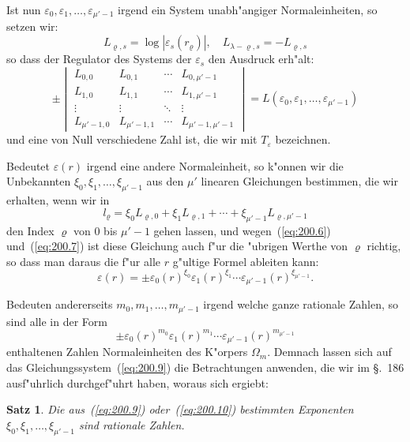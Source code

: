\documentclass[10pt,a4paper]{article}
\theoremstyle{weberstyle}
\newtheorem{satz}{Satz}[section]
\begin{document}
Ist nun $\varepsilon_0,\varepsilon_1,\dots,\varepsilon_{\mu'-1}$ irgend ein System
unabh"angiger Normaleinheiten, so setzen wir:
\begin{equation}\label{eq:200.7}
L_{\varrho,s}=\log|\varepsilon_s(r_\varrho)|,\quad L_{\lambda-\varrho,s}=-L_{\varrho,s}
\end{equation}
so dass der Regulator des Systems der $\varepsilon_s$ den Ausdruck erh"alt:
\begin{equation}\label{eq:200.8}
\pm\begin{vmatrix}
L_{0,0} & L_{0,1} & \cdots & L_{0,\mu'-1} \\
L_{1,0} & L_{1,1} & \cdots & L_{1,\mu'-1} \\
\vdots & \vdots & \ddots & \vdots \\
L_{\mu'-1,0} & L_{\mu'-1,1} & \cdots & L_{\mu'-1,\mu'-1}
\end{vmatrix}
= L(\varepsilon_0,\varepsilon_1,\dots,\varepsilon_{\mu'-1})
\end{equation}
und eine von Null verschiedene Zahl ist, die wir mit $T_\varepsilon$ bezeichnen.

Bedeutet $\varepsilon(r)$ irgend eine andere Normaleinheit, so k"onnen wir die
Unbekannten $\xi_0,\xi_1,\dots,\xi_{\mu'-1}$ aus den $\mu'$ linearen Gleichungen
bestimmen, die wir erhalten, wenn wir in
\begin{equation}\label{eq:200.9}
l_\varrho = \xi_0 L_{\varrho,0} + \xi_1 L_{\varrho,1} + \cdots +
\xi_{\mu'-1} L_{\varrho,\mu'-1}
\end{equation}
den Index $\varrho$ von $0$ bis $\mu'-1$ gehen lassen, und wegen~(\ref{eq:200.6})
und~(\ref{eq:200.7}) ist diese Gleichung auch f"ur die "ubrigen Werthe von
$\varrho$ richtig, so dass man daraus die f"ur alle $r$ g"ultige Formel
ableiten kann:
\begin{equation}\label{eq:200.10}
\varepsilon(r) = \pm\varepsilon_0(r)^{\xi_0}\varepsilon_1(r)^{\xi_1}
\cdots\varepsilon_{\mu'-1}(r)^{\xi_{\mu'-1}}.
\end{equation}

Bedeuten andererseits $m_0,m_1,\dots,m_{\mu'-1}$ irgend welche ganze
rationale Zahlen, so sind alle in der Form
\[
\pm\varepsilon_0(r)^{m_0}\varepsilon_1(r)^{m_1}
\cdots\varepsilon_{\mu'-1}(r)^{m_{\mu'-1}}
\]
enthaltenen Zahlen Normaleinheiten des K"orpers $\Omega_m$. Demnach lassen
sich auf das Gleichungssystem~(\ref{eq:200.9}) die Betrachtungen anwenden,
die wir im \S.~186 ausf"uhrlich durchgef"uhrt haben, woraus sich ergiebt:

\begin{satz}
Die aus~(\ref{eq:200.9}) oder~(\ref{eq:200.10}) bestimmten Exponenten
$\xi_0,\xi_1,\dots,\xi_{\mu'-1}$ sind rationale Zahlen.
\end{satz}
\end{document}
